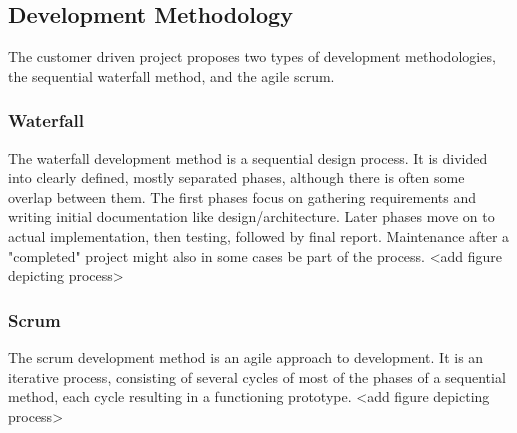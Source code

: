 \subsection{Development Methodology}
The customer driven project proposes two types of development methodologies, the sequential waterfall method, and the agile scrum.
\subsubsection{Waterfall}
The waterfall development method is a sequential design process. It is divided into clearly defined, mostly separated phases, although there is often some overlap between them. The first phases focus on gathering requirements and writing initial documentation like design/architecture. Later phases move on to actual implementation, then testing, followed by final report. Maintenance after a "completed" project might also in some cases be part of the process. <add figure depicting process>
\subsubsection{Scrum}
The scrum development method is an agile approach to development. It is an iterative process, consisting of several cycles of most of the phases of a sequential method, each cycle resulting in a functioning prototype. <add figure depicting process>
